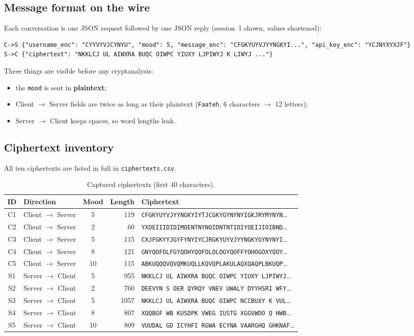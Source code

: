 \documentclass[11pt,a4paper]{article}
\DeclareRobustCommand{\_}{\textunderscore\allowbreak}  %
\newcommand{\ct}[1]{\texttt{#1}}
\newcommand{\csdir}{Client $\rightarrow$ Server}
\newcommand{\scdir}{Server $\rightarrow$ Client}
\begin{document}
\subsection{Message format on the wire}
Each conversation is one JSON request followed by one JSON reply (session~1 shown, values shortened):
\begin{lstlisting}
C->S {"username_enc": "CYYVYVJCYNYU", "mood": 5, "message_enc": "CFGKYUYVJYYNGKYI...", "api_key_enc": "YCJNYXYXJF"}
S->C {"ciphertext": "NKKLCJ UL AIWXRA BUQC OIWPC YIUXY LJPIWYJ K LIWYJ ..."}
\end{lstlisting}
Three things are visible before any cryptanalysis:
\begin{itemize}
\item the \ct{mood} is sent in \textbf{plaintext};
\item \csdir{} fields are twice as long as their plaintext (\ct{Faateh}, 6 characters $\rightarrow$ 12 letters);
\item \scdir{} keeps spaces, so word lengths leak.
\end{itemize}

\subsection{Ciphertext inventory}
All ten ciphertexts are listed in full in \ct{ciphertexts.csv}.

\begin{table}[H]\centering\small
\caption{Captured ciphertexts (first 40 characters).}
\begin{tabular}{c l c r l}
\toprule
ID & Direction & Mood & Length & Ciphertext \\
\midrule
C1 & \csdir & 5  & 119  & \ct{CFGKYUYVJYYNGKYIYTJCGKYGYNYNYIGKJRYMYNYN}\ldots \\
C2 & \csdir & 2  & 60   & \ct{YXOEIIIDIDIMOENTNYNOIDNTNTIDIYOEIJIOIBND}\ldots \\
C3 & \csdir & 5  & 115  & \ct{CXJFGKYYJGYFYNYIYCJRGKYUYVJYYNGKYGYNYNYI}\ldots \\
C4 & \csdir & 8  & 121  & \ct{GNYQOFOLFGYQOHYQOFOLOLOGYQOFFYOHOGOXYQOY}\ldots \\
C5 & \csdir & 10 & 115  & \ct{ABKUQQQVQVQMKUQLLKQVQPLAKULAQXQAQPLBKUQP}\ldots \\
S1 & \scdir & 5  & 955  & \ct{NKKLCJ UL AIWXRA BUQC OIWPC YIUXY LJPIWYJ}\ldots \\
S2 & \scdir & 2  & 760  & \ct{DEEVYN S OER QYRQY VNEV UWALY DYYHSRI WFY}\ldots \\
S3 & \scdir & 5  & 1057 & \ct{NKKLCJ UL AIWXRA BUQC OIWPC NCCBUXY K VUL}\ldots \\
S4 & \scdir & 8  & 807  & \ct{XQQBGF WB KUSDPK VWEG IUSTG XGGVWDO Q HWB}\ldots \\
S5 & \scdir & 10 & 809  & \ct{VUUDAL GD ICYHFI RGWA ECYNA VAARGHQ GHKNAF}\ldots \\
\bottomrule
\end{tabular}
\end{table}
\end{document}
